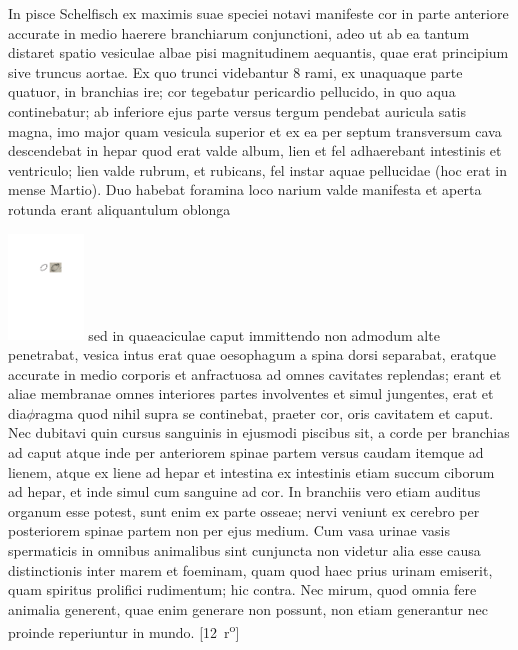\pend%
\pstart%
In pisce Schelfisch ex maximis suae speciei notavi manifeste cor in parte anteriore accurate in medio haerere branchiarum conjunctioni, adeo ut ab ea tantum distaret spatio vesiculae albae pisi magnitudinem aequantis, quae erat principium sive truncus aortae. Ex quo trunci videbantur 8 rami, ex unaquaque parte quatuor, in branchias ire; cor tegebatur pericardio pellucido, in quo aqua continebatur; ab inferiore ejus parte versus tergum pendebat auricula satis magna, imo major quam vesicula superior et ex ea per septum transversum cava descendebat in hepar quod erat valde album, lien et fel adhaerebant intestinis et ventriculo; lien valde rubrum, et rubicans, fel instar aquae pellucidae (hoc erat in mense Martio). Duo habebat foramina loco narium valde manifesta et aperta rotunda erant aliquantulum oblonga
\rule[-2mm]{0mm}{12mm}\includegraphics[width=0.15\textwidth]{images/lh0040104b_011v4.pdf}
sed in quaeaciculae caput immittendo non admodum alte penetrabat, vesica intus erat quae oesophagum a spina dorsi separabat, eratque accurate in medio corporis et anfractuosa ad omnes cavitates replendas; erant et aliae membranae omnes interiores partes involventes et simul jungentes, erat et dia$\phi$ragma quod nihil supra se continebat, praeter cor, oris cavitatem et caput. Nec dubitavi quin cursus sanguinis in ejusmodi piscibus sit, a corde per branchias ad caput atque inde per anteriorem spinae partem versus caudam itemque ad lienem, atque ex liene ad hepar et intestina ex intestinis etiam succum ciborum ad hepar, et inde simul cum sanguine ad cor. In branchiis vero etiam auditus organum esse potest, sunt enim ex parte osseae; nervi veniunt ex cerebro per posteriorem spinae partem non per ejus medium.
\pend
\pstart%
Cum vasa urinae vasis spermaticis in omnibus animalibus sint cunjuncta non videtur alia esse causa distinctionis inter marem et foeminam, quam quod haec prius urinam emiserit, quam spiritus prolifici rudimentum;
hic contra. Nec mirum, quod omnia fere animalia generent, quae enim generare non possunt, non etiam generantur nec proinde reperiuntur in mundo.
[12~r\textsuperscript{o}]
\pend%
\count{}
\count{}
\count{}